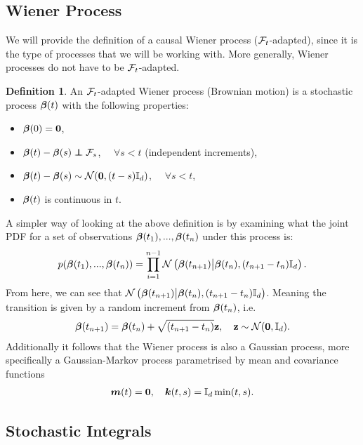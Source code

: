 \documentclass[a4paper,12pt,twoside,openright]{report}
\theoremstyle{definition}
\newtheorem{definition}{Definition}[section]
\begin{document}
\subsection{Wiener Process}

We will provide the definition of a causal Wiener process (${\mathcal{F}}_t$-adapted), since it is the type of processes that we will be working with. More generally, Wiener processes do not have to be ${\mathcal{F}}_t$-adapted.
\begin{definition}
    An ${\mathcal{F}}_t$-adapted Wiener process (Brownian motion) is a stochastic process ${\bm{\beta}}(t)$ with the following properties:
    \begin{itemize}
        \item ${\bm{\beta}}(0) = {\bm{0}}$,
        \item  $\rvw(t) - \rvw(s) \independent \calF_s$, $\quad \forall s < t$ (independent increments),
        \item ${\bm{\beta}}(t) - {\bm{\beta}}(s) \sim {\mathcal{N}} ( {\bm{0}},  (t - s) {\mathbb{I}_d})$, $\quad\forall s < t$,
        \item ${\bm{\beta}}(t)$ is continuous in $t$.
    \end{itemize}
\end{definition}
A simpler way of looking at the above definition is by examining what the joint PDF for a set of observations ${\bm{\beta}}(t_1), ..., {\bm{\beta}}(t_n)$ under this process is:
\begin{align*}
    p({\bm{\beta}}(t_1), ..., {\bm{\beta}}(t_n)) = \prod_{i=1}^{n-1} {\mathcal{N}}\left({\bm{\beta}}(t_{n+1})\big| {\bm{\beta}}(t_{n}), (t_{n+1}- t_{n}){\mathbb{I}_d} \right).
\end{align*}
From here, we can see that ${\mathcal{N}}\left({\bm{\beta}}(t_{n+1})\big| {\bm{\beta}}(t_{n}), (t_{n+1}- t_{n}){\mathbb{I}_d} \right)$.  Meaning the transition is given by a random increment from  ${\bm{\beta}}(t_{n})$, i.e.
\begin{align*}
    {\bm{\beta}}(t_{n+1}) = {\bm{\beta}}(t_{n}) +  \sqrt{(t_{n+1}- t_{n})}{\mathbf{z}} , \quad {\mathbf{z}} \sim {\mathcal{N}}({\bm{0}}, {\mathbb{I}_d}) .
\end{align*}
Additionally it follows that the Wiener process is also a Gaussian process, more specifically a Gaussian-Markov process parametrised by mean and covariance functions
\begin{align*}
    {\bm{m}}(t) = {\bm{0}}, \quad {\bm{k}}(t, s) = {\mathbb{I}_d}\min(t, s).
\end{align*}

\subsection{Stochastic Integrals}
\end{document}
